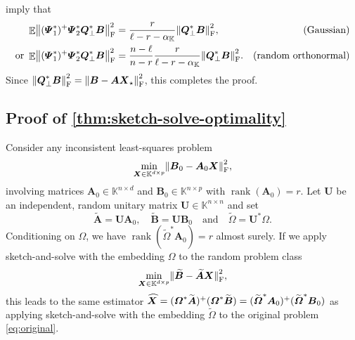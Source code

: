 \documentclass[11pt]{article}
\newcommand{\field}{\mathbb{K}}
\DeclareMathOperator{\rank}{rank}
\newcommand{\mat}[1]{\boldsymbol{#1}}
\newcommand{\norm}[1]{\mleft\| #1 \mright\|}
\DeclareMathOperator{\expect}{\mathbb{E}}
\renewcommand{\tilde}[1]{\widetilde{#1}}
\newcommand{\hatbold}[1]{%
  \skew{4}\widehat{\smash{\boldsymbol{#1}}\mathstrut}}
\newcommand{\Xhat}{\smash{\hatbold{X}}}
\theoremstyle{definition}
\numberwithin{equation}{section}
\begin{document}
 imply that
%
\begin{equation*}
    \begin{alignedat}{2}
        \expect \norm{(\mat{\varPsi}_1^*)^+ \mat{\varPsi}_2^* \mat{Q}_{\perp}^* \mat{B}}_{\rm F}^2 &= \frac{r}{\ell - r - \alpha_\field} \norm{\mat{Q}_\perp^*\mat{B}}_{\rm F}^2, & \quad \text{(Gaussian)} \\
        \text{or } \expect \norm{(\mat{\varPsi}_1^*)^+ \mat{\varPsi}_2^* \mat{Q}_{\perp}^* \mat{B}}_{\rm F}^2 &= 
        \frac{n-\ell}{n-r} \frac{r}{\ell - r - \alpha_\field} \norm{\mat{Q}_\perp^*\mat{B}}_{\rm F}^2. & \quad \text{(random orthonormal)}
    \end{alignedat}
\end{equation*}
Since $\norm{\mat{Q}_\perp^*\mat{B}}_{\rm F}^2 = \norm{\mat{B} - \mat{A}\mat{X}_{\star}}_{\rm F}^2$, this completes the proof.

\subsection{Proof of \texorpdfstring{\cref{thm:sketch-solve-optimality}}{Theorem 2.2}} \label{sec:proof_optimality}

Consider any inconsistent least-squares problem
\begin{equation}
\label{eq:original}
    \min_{\mat{X} \in \field^{d\times p}} \norm{\mat{B}_0 - \mat{A}_0 \mat{X}}_{\rm F}^2,
\end{equation}
involving matrices $\mat{A}_0 \in \field^{n \times d}$ and $\mat{B}_0 \in \field^{n \times p}$ with $\rank(\mat{A}_0) = r$.
Let $\mat{U}$ be an independent, random unitary matrix $\mat{U} \in \field^{n \times n}$ and set
\begin{equation*}
    \tilde{\mat{A}} = \mat{U} \mat{A}_0,
    \quad \tilde{\mat{B}} = \mat{U} \mat{B}_0
    \quad \text{and} \quad
    \tilde{\mat{\varOmega}} = \mat{U}^* \mat{\varOmega}.
\end{equation*}
Conditioning on $\mat{\varOmega}$, we have
$\rank(\tilde{\mat{\varOmega}}^*\mat{A}_0)=r$
almost surely.
If we apply sketch-and-solve with the embedding $\mat{\varOmega}$ to the random problem class
%
\begin{equation*}
    \min_{\mat{X} \in \field^{d\times p}} 
    \norm{\smash{\mat{\tilde{B}} - \mat{\tilde{A}}\mat{X}}}_{\rm F}^2,
\end{equation*}
%
this leads to the same estimator $\Xhat = (\mat{\varOmega}^* \tilde{\mat{A}})^+(\mat{\varOmega}^* \tilde{\mat{B}}) = (\tilde{\mat{\varOmega}}^* \mat{A}_0)^+(\tilde{\mat{\varOmega}}^* \mat{B}_0)$ as applying sketch-and-solve with the embedding $\tilde{\mat{\varOmega}}$ to the original problem \cref{eq:original}.
\end{document}
